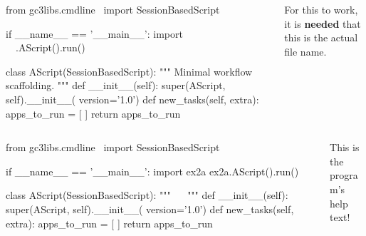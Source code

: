 \documentclass[english,serif,mathserif,xcolor=pdftex,dvipsnames,table]{beamer}
\begin{document}
\begin{frame}[fragile]
  \begin{columns}[t]
    \begin{column}{0.7\linewidth}
\begin{python}
from gc3libs.cmdline \
  import SessionBasedScript

if __name__ == '__main__':
  import ~~
  ~\HL{ex2a}~.AScript().run()

class AScript(SessionBasedScript):
  """
  Minimal workflow scaffolding.
  """
  def __init__(self):
    super(AScript, self).__init__(
        version='1.0')
  def new_tasks(self, extra):
    apps_to_run = [ ]
    return apps_to_run
\end{python}
    \end{column}
    \begin{column}{0.4\linewidth}
      \begin{flushright}
        For this to work, it is \textbf{needed} that this is the
        actual file name.
      \end{flushright}
    \end{column}
  \end{columns}
\end{frame}


\begin{frame}[fragile]
  \begin{columns}
    \begin{column}{0.7\linewidth}
\begin{python}
from gc3libs.cmdline \
  import SessionBasedScript

if __name__ == '__main__':
  import ex2a
  ex2a.AScript().run()

class AScript(SessionBasedScript):
  """
  ~~
  """
  def __init__(self):
    super(AScript, self).__init__(
        version='1.0')
  def new_tasks(self, extra):
    apps_to_run = [ ]
    return apps_to_run
\end{python}
    \end{column}
    \begin{column}{0.4\linewidth}
      \begin{flushright}
        This is the \\ program's help text!
      \end{flushright}
    \end{column}
  \end{columns}
\end{frame}
\end{document}
